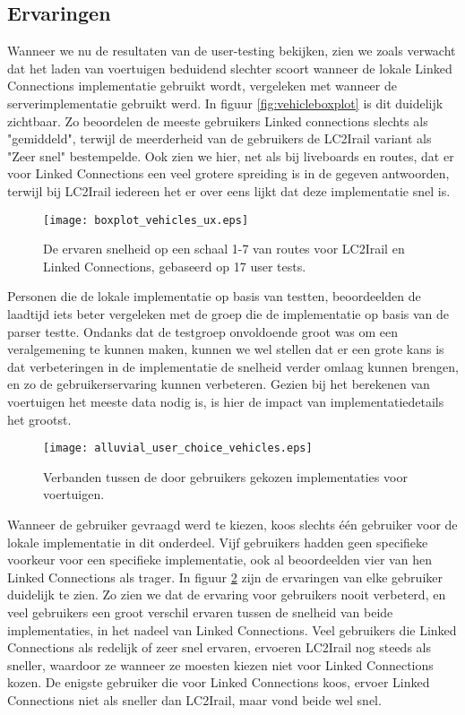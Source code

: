 \subsection{Ervaringen}
Wanneer we nu de resultaten van de user-testing bekijken, zien we zoals verwacht dat het laden van voertuigen beduidend slechter scoort wanneer de lokale Linked Connections implementatie gebruikt wordt, vergeleken met wanneer de serverimplementatie gebruikt werd. In figuur \ref{fig:vehicleboxplot} is dit duidelijk zichtbaar. Zo beoordelen de meeste gebruikers Linked connections slechts als "gemiddeld", terwijl de meerderheid van de gebruikers de LC2Irail variant als "Zeer snel" bestempelde. Ook zien we hier, net als bij liveboards en routes, dat er voor Linked Connections een veel grotere spreiding is in de gegeven antwoorden, terwijl  bij LC2Irail iedereen het er over eens lijkt dat deze implementatie snel is.

\begin{figure}[h]
	\centering
	\texttt{[image: boxplot\_vehicles\_ux.eps]}
	\caption[Ervaren snelheid van routes]{De ervaren snelheid op een schaal 1-7 van routes voor LC2Irail en Linked Connections, gebaseerd op 17 user tests.}
	\label{fig:vehiclesUx}
\end{figure}

Personen die de lokale implementatie op basis van  testten, beoordeelden de laadtijd iets beter vergeleken met de groep die de implementatie op basis van de  parser testte. Ondanks dat de testgroep onvoldoende groot was om een veralgemening te kunnen maken, kunnen we wel stellen dat er een grote kans is dat verbeteringen in de implementatie de snelheid verder omlaag kunnen brengen, en zo de gebruikerservaring kunnen verbeteren. Gezien bij het berekenen van voertuigen het meeste data nodig is, is hier de impact van implementatiedetails het grootst.

\begin{figure}[ht]
	\centering
	\texttt{[image: alluvial\_user\_choice\_vehicles.eps]}
	\caption[Door gebruikers gekozen implementatie voor voertuigen]{Verbanden tussen de door gebruikers gekozen implementaties voor voertuigen. }
	\label{fig:alluvialUserChoicesVehicles}
\end{figure}

Wanneer de gebruiker gevraagd werd te kiezen, koos slechts één gebruiker voor de lokale implementatie in dit onderdeel. Vijf gebruikers hadden geen specifieke voorkeur voor een specifieke implementatie, ook al beoordeelden vier van hen Linked Connections als trager. In figuur \ref{fig:alluvialUserChoicesVehicles} zijn de ervaringen van elke gebruiker duidelijk te zien. Zo zien we dat de ervaring voor gebruikers nooit verbeterd, en veel gebruikers een groot verschil ervaren tussen de snelheid van beide implementaties, in het nadeel van Linked Connections. Veel gebruikers die Linked Connections als redelijk of zeer snel ervaren, ervoeren LC2Irail nog steeds als sneller, waardoor ze wanneer ze moesten kiezen niet voor Linked Connections kozen. De enigste gebruiker die voor Linked Connections koos, ervoer Linked Connections niet als sneller dan LC2Irail, maar vond beide wel snel.

